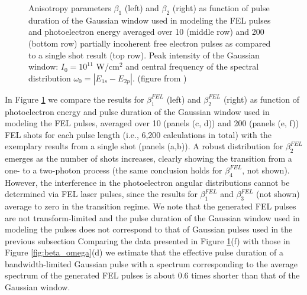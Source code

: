 \begin{figure}[!ht]
\caption{
Anisotropy parameters $\beta_1$ (left) and $\beta_2$ (right) as function of pulse duration of the Gaussian window used in modeling the FEL pulses and photoelectron energy averaged over 10 (middle row) and 200 (bottom row) partially incoherent free electron pulses as compared to a single shot result (top row). Peak intensity of the Gaussian window: $I_{0} = 10^{11}$ W/cm$^2$ 
and central frequency of the spectral distribution $\omega_0 = |E_{1s}-E_{2p}|$. (figure from \cite{venzke2020_ionization})
} 
  \label{fig:beta-variation-FEL}
\end{figure}

In Figure \ref{fig:beta-variation-FEL} we compare the results for $\beta_1^{FEL}$ (left) and $\beta_2^{FEL}$ (right) as function of photoelectron energy and pulse duration of the Gaussian window used in modeling the FEL pulses, averaged over 10 (panels (c, d)) and 200 (panels (e, f)) FEL shots for each pulse length (i.e., 6,200 calculations in total) with the exemplary results from a single shot (panels (a,b)). A robust distribution for $\beta_2^{FEL}$ emerges as the number of shots increases, clearly showing the transition from a one- to a two-photon process (the same conclusion holds for $\beta_4^{FEL}$, not shown). However, the interference in the photoelectron angular distributions cannot be determined via FEL laser pulses, since the results for $\beta_1^{FEL}$ and $\beta_3^{FEL}$ (not shown) average to zero in the transition regime. 
We note that the generated FEL pulses are not transform-limited and the pulse duration of the Gaussian window used in modeling the pulses does not correspond to that of Gaussian pulses used in the previous subsection
Comparing the data presented in Figure \ref{fig:beta-variation-FEL}(f) with those in Figure \ref{fig:beta_omega}(d) we estimate that the effective pulse duration of a bandwidth-limited Gaussian pulse with a spectrum corresponding to the average spectrum of the generated FEL pulses is about 0.6 times shorter than that of the Gaussian window.

